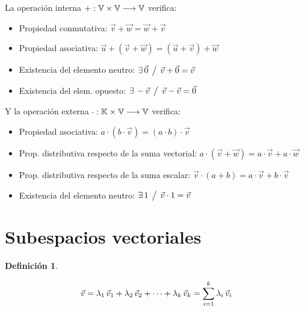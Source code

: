 \documentclass[a5paper,12pt,twoside]{book}
\newtheorem{defn}{{Definición}}[chapter]
\begin{document}
La operación interna $+:\mathbb{V} \times \mathbb{V} \longrightarrow \mathbb{V} $ verifica:

\begin{itemize}
    \item Propiedad conmutativa: $\Vec{v}+\Vec{w}=\Vec{w}+\Vec{v}$
    \item Propiedad asociativa: $\Vec{u} + \left( \Vec{v}+\Vec{w} \right) = \left( \Vec{u} + \Vec{v} \right) + \Vec{w}$
    \item Existencia del elemento neutro: $\exists \, \Vec{0} \hspace{1ex} \big/ \hspace{1ex} \Vec{v} + \Vec{0} = \Vec{v}$
    \item Existencia del elem. opuesto: $\exists \, -\Vec{v} \hspace{1ex} \big/ \hspace{1ex} \Vec{v} - \Vec{v} = \Vec{0}$
\end{itemize}

Y la operación externa $\cdot:\mathbb{K} \times \mathbb{V} \longrightarrow \mathbb{V}$ verifica:

\begin{itemize}
    \item Propiedad asociativa: $a \cdot \left( b \cdot \Vec{v} \right) = \left( a \cdot b \right) \cdot \Vec{v}$
    \item Prop. distributiva respecto de la suma vectorial: $a \cdot \left( \Vec{v} + \Vec{w} \right) = a \cdot \Vec{v} + a \cdot \Vec{w}$
    \item Prop. distributiva respecto de la suma escalar: $\Vec{v} \cdot \left(a+b\right) = a \cdot \Vec{v} + b \cdot \Vec{v}$
    \item Existencia del elemento neutro: $\exists \, 1 \hspace{1ex} \big/ \hspace{1ex} \Vec{v} \cdot 1 = \Vec{v}$
\end{itemize}


\section{Subespacios vectoriales}

\begin{mdframed}[style=MyFrame1]
    \begin{defn}
    \end{defn}
    \begin{equation*}
        \Vec{v} = \lambda_1 \, \Vec{v}_1 + \lambda_2 \, \Vec{v}_2 + \dots + \lambda_k \, \Vec{v}_k
        = \sum_{i=1}^k \lambda_i \, \Vec{v}_i
    \end{equation*}
\end{mdframed}
\end{document}
